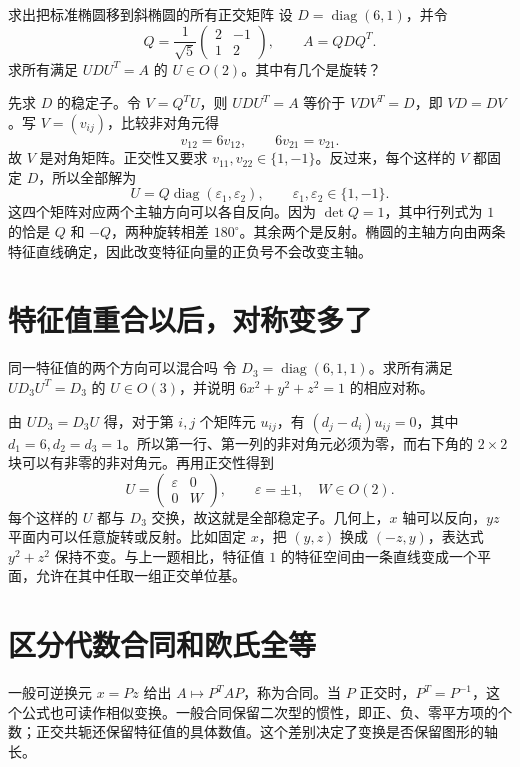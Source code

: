 \begin{example}{求出把标准椭圆移到斜椭圆的所有正交矩阵}
设 \(D=\operatorname{diag}(6,1)\)，并令
\[
 Q=\frac1{\sqrt5}\begin{pmatrix}2&-1\\1&2\end{pmatrix},
 \qquad A=QDQ^T.
\]
求所有满足 \(UDU^T=A\) 的 \(U\in O(2)\)。其中有几个是旋转？
\end{example}
\begin{solution}
先求 \(D\) 的稳定子。令 \(V=Q^TU\)，则 \(UDU^T=A\) 等价于 \(VDV^T=D\)，即 \(VD=DV\)。写 \(V=(v_{ij})\)，比较非对角元得
\[
 v_{12}=6v_{12},\qquad 6v_{21}=v_{21}.
\]
故 \(V\) 是对角矩阵。正交性又要求 \(v_{11},v_{22}\in\{1,-1\}\)。反过来，每个这样的 \(V\) 都固定 \(D\)，所以全部解为
\[
 U=Q\operatorname{diag}(\varepsilon_1,\varepsilon_2),
 \qquad \varepsilon_1,\varepsilon_2\in\{1,-1\}.
\]
这四个矩阵对应两个主轴方向可以各自反向。因为 \(\det Q=1\)，其中行列式为 \(1\) 的恰是 \(Q\) 和 \(-Q\)，两种旋转相差 \(180^\circ\)。其余两个是反射。椭圆的主轴方向由两条特征直线确定，因此改变特征向量的正负号不会改变主轴。
\end{solution}

\section{特征值重合以后，对称变多了}
\begin{example}{同一特征值的两个方向可以混合吗}
令 \(D_3=\operatorname{diag}(6,1,1)\)。求所有满足 \(UD_3U^T=D_3\) 的 \(U\in O(3)\)，并说明 \(6x^2+y^2+z^2=1\) 的相应对称。
\end{example}
\begin{solution}
由 \(UD_3=D_3U\) 得，对于第 \(i,j\) 个矩阵元 \(u_{ij}\)，有 \((d_j-d_i)u_{ij}=0\)，其中 \(d_1=6,d_2=d_3=1\)。所以第一行、第一列的非对角元必须为零，而右下角的 \(2\times2\) 块可以有非零的非对角元。再用正交性得到
\[
 U=\begin{pmatrix}\varepsilon&0\\0&W\end{pmatrix},
 \qquad \varepsilon=\pm1,\quad W\in O(2).
\]
每个这样的 \(U\) 都与 \(D_3\) 交换，故这就是全部稳定子。几何上，\(x\) 轴可以反向，\(yz\) 平面内可以任意旋转或反射。比如固定 \(x\)，把 \((y,z)\) 换成 \((-z,y)\)，表达式 \(y^2+z^2\) 保持不变。与上一题相比，特征值 \(1\) 的特征空间由一条直线变成一个平面，允许在其中任取一组正交单位基。
\end{solution}

\section{区分代数合同和欧氏全等}
一般可逆换元 \(x=Pz\) 给出 \(A\mapsto P^TAP\)，称为合同。当 \(P\) 正交时，\(P^T=P^{-1}\)，这个公式也可读作相似变换。一般合同保留二次型的惯性，即正、负、零平方项的个数；正交共轭还保留特征值的具体数值。这个差别决定了变换是否保留图形的轴长。

